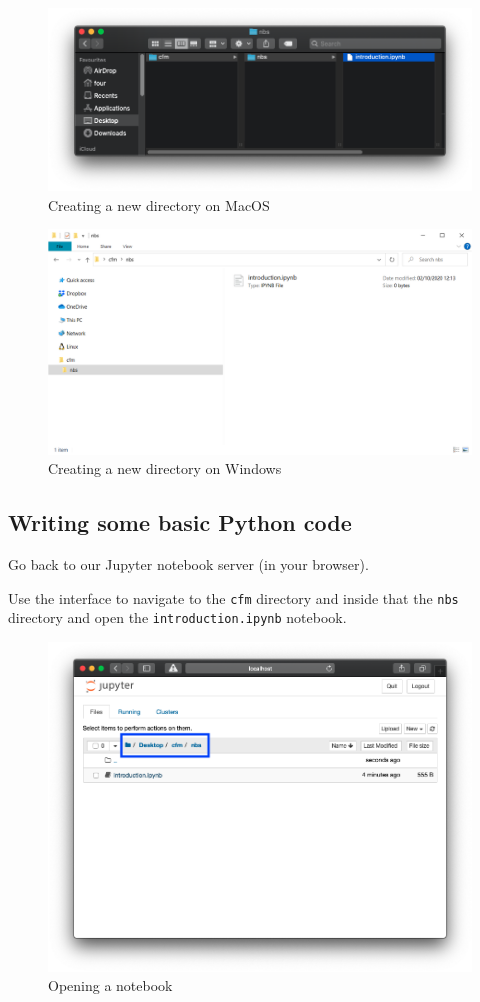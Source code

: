 \begin{figure}[htbp]
\centering
    \includegraphics[width=0.750\linewidth]{assets/new_directory_structure/main.png}
    \caption{Creating a new directory on MacOS}\label{fig:new_directory_structure}
\end{figure}


\begin{figure}[htbp]
\centering
    \includegraphics[width=0.750\linewidth]{assets/new_directory_structure_windows/main.png}
    \caption{Creating a new directory on
    Windows}\label{fig:new_directory_structure_windows}
\end{figure}


\subsection{Writing some basic Python code}
Go back to our Jupyter notebook server (in your browser).

Use the interface to navigate to the \texttt{cfm} directory and inside that the \texttt{nbs}
directory and open the \texttt{introduction.ipynb} notebook.

\begin{figure}[htbp]
\centering
    \includegraphics[width=0.750\linewidth]{assets/opening_notebook/main.png}
    \caption{Opening a notebook}
\end{figure}

